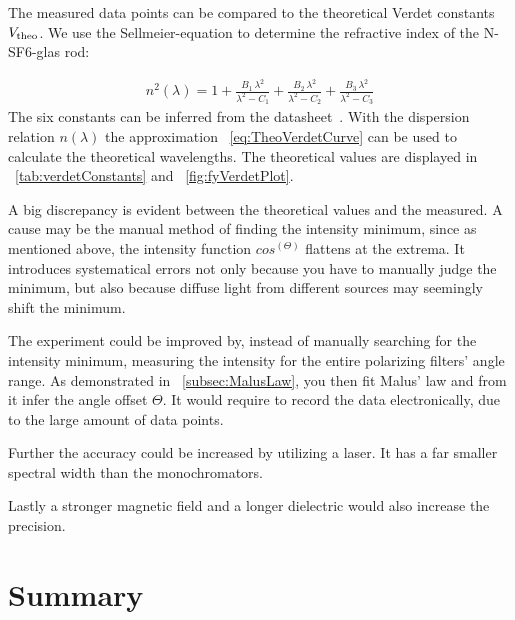 \documentclass[a4paper,10pt,twocolumn]{article}
\newcommand{\NSF}{N-SF6}
\begin{document}
    The measured data points can be compared to the theoretical Verdet constants $V_{\mathrm{theo}}$.
    We use the Sellmeier-equation to determine the refractive index of the \NSF-glas rod:
    \newcommand{\SellmeierEqPart}[1]{\frac{B_{#1} \, \lambda^2}{\lambda^2 - C_{#1}}}
    
    \begin{align}
        \label{eq:Sellmeier}
        n^2(\lambda) = 1 + \SellmeierEqPart{1} + \SellmeierEqPart{2} + \SellmeierEqPart{3}
    \end{align}
    The six constants can be inferred from the datasheet~\cite{glassTubeDatasheet}.
    With the dispersion relation $n(\lambda)$ the approximation ~\eqref{eq:TheoVerdetCurve} can
    be used to calculate the theoretical wavelengths.
    The theoretical values are displayed in ~\autoref{tab:verdetConstants} and ~\autoref{fig:fyVerdetPlot}.
    
    A big discrepancy is evident between the theoretical values and the measured.
    A cause may be the manual method of finding the intensity minimum, since as mentioned above,
    the intensity function $cos^(\Theta)$ flattens at the extrema.
    It introduces systematical errors not only because you have to manually judge the minimum, but
    also because diffuse light from different sources may seemingly shift the minimum.
    
    The experiment could be improved by, instead of manually searching for the intensity minimum,
    measuring the intensity for the entire polarizing filters' angle range.
    As demonstrated in ~\autoref{subsec:MalusLaw}, you then fit Malus' law and from it infer 
    the angle offset $\Theta$.
    It would require to record the data electronically, due to the large amount of data points.
    
    Further the accuracy could be increased by utilizing a laser.
    It has a far smaller spectral width than the monochromators.
    
    Lastly a stronger magnetic field and a longer dielectric would also increase the precision.
    
    \section{Summary}
    
\end{document}
